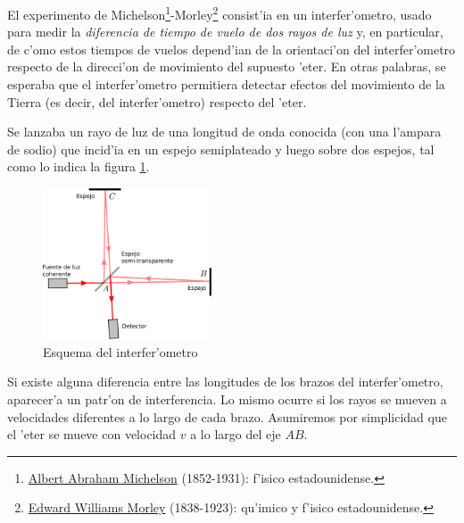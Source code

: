 El experimento de Michelson\footnote{\href{http://es.wikipedia.org/wiki/Albert_Abraham_Michelson}{Albert Abraham Michelson} (1852-1931): f'isico estadounidense.}-Morley\footnote{\href{http://es.wikipedia.org/wiki/Edward_Morley}{Edward Williams Morley} (1838-1923): qu'imico y f'isico estadounidense.} \cite{MM87} consist'ia en un interfer'ometro, usado para medir la \textit{diferencia de tiempo de vuelo de dos rayos de luz} y, en particular, de c'omo estos tiempos de vuelos depend'ian de la orientaci'on del interfer'ometro respecto de la direcci'on de movimiento del supuesto 'eter. En otras palabras, se esperaba que el interfer'ometro permitiera detectar efectos del movimiento de la Tierra (es decir, del interfer'ometro) respecto del 'eter.

Se lanzaba un rayo de luz de una longitud de onda conocida (con una l'ampara de sodio) que incid'ia en un espejo semiplateado y luego sobre dos espejos, tal como lo indica la figura \ref{fig:michelson}.
\begin{figure}[ht]
\begin{center}
\includegraphics[width=5cm]{fig/fig-interferometro.pdf}
\end{center}
\caption{Esquema del interfer'ometro} \label{fig:michelson}
\end{figure}

Si existe alguna diferencia entre las longitudes de los brazos del interfer'ometro, aparecer'a un patr'on de interferencia. Lo mismo ocurre si los rayos se mueven a velocidades diferentes a lo largo de cada brazo. Asumiremos por simplicidad que el 'eter se mueve con velocidad $v$ a lo largo del eje $AB$.

